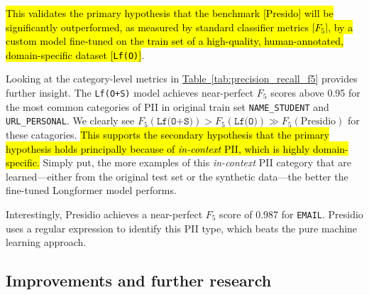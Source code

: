 \documentclass[11pt]{article}
\newcommand{\Tablink}[1]{\hyperref[#1]{Table~\ref*{#1}}}
\begin{document}
\hl{This validates the primary hypothesis that the benchmark [Presido] will be significantly outperformed, as measured by standard classifier metrics [$F_5$], by a custom model fine-tuned on the train set of a high-quality, human-annotated, domain-specific dataset [\texttt{Lf(O)}]}.

Looking at the category-level metrics in \Tablink{tab:precision_recall_f5} provides further insight. The \texttt{Lf(O+S)} model achieves near-perfect $F_5$ scores above 0.95 for the most common categories of PII in original train set \texttt{NAME\_STUDENT} and \texttt{URL\_PERSONAL}. We clearly see \( F_5(\texttt{Lf(O+S)}) > F_5(\texttt{Lf(O)}) \gg F_5(\text{Presidio}) \) for these catagories. \hl{This supports the secondary hypothesis that the primary hypothesis holds principally because of \textit{in-context} PII, which is highly domain-specific.} Simply put, the more examples of this \textit{in-context} PII category that are learned—either from the original test set or the synthetic data—the better the fine-tuned Longformer model performs.

Interestingly, Presidio achieves a near-perfect $F_5$ score of 0.987 for \texttt{EMAIL}. Presidio uses a regular expression to identify this PII type, which beats the pure machine learning approach.

\subsection{Improvements and further research}
\end{document}
